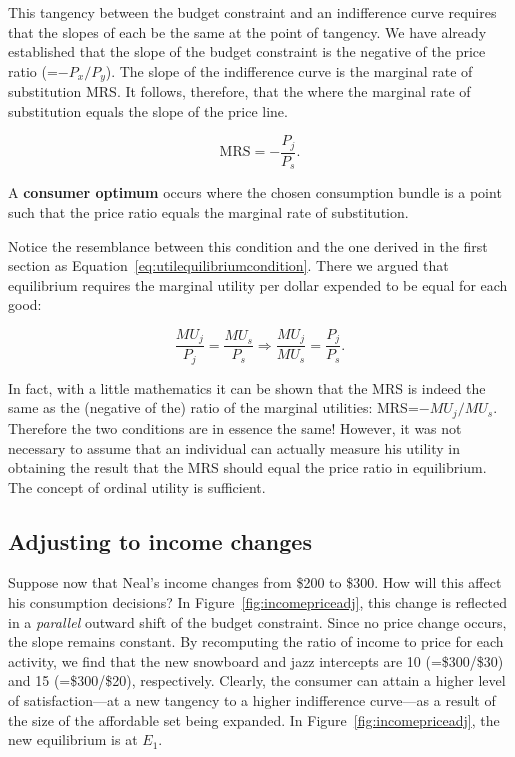This tangency between the budget constraint and an indifference curve requires that the slopes of each be the same at the point of tangency. We have already established that the slope of the budget constraint is the negative of the price ratio (=$-P_x/P_y$). The slope of the indifference curve is the marginal rate of substitution MRS. It follows, therefore, that the  where the marginal rate of substitution equals the slope of the price line.

\begin{equation} \label{eq:MRS}
\text{MRS}=-\frac{P_j}{P_s}.
\end{equation}

\begin{DefBox}
A \textbf{consumer optimum} occurs where the chosen consumption bundle is a point such that the price ratio equals the marginal rate of substitution.
\end{DefBox}

Notice the resemblance between this condition and the one derived in the first section as Equation~\ref{eq:utilequilibriumcondition}. There we argued that equilibrium requires the marginal utility per dollar expended to be equal for each good:

\begin{equation} \label{eq:marginalutilityprice}
\frac{MU_j}{P_j}=\frac{MU_s}{P_s}\Rightarrow\frac{MU_j}{MU_s}=\frac{P_j}{P_s}.
\end{equation}

In fact, with a little mathematics it can be shown that the MRS is indeed the same as the (negative of the) ratio of the marginal utilities: MRS=$-MU_j/MU_s$. Therefore the two conditions are in essence the same! However, it was not necessary to assume that an individual can actually measure his utility in obtaining the result that the MRS should equal the price ratio in equilibrium. The concept of ordinal utility is sufficient.

\subsection*{Adjusting to income changes}

Suppose now that Neal's income changes from \$200 to \$300. How will this affect his consumption decisions? In Figure~\ref{fig:incomepriceadj}, this change is reflected in a \textit{parallel} outward shift of the budget constraint. Since no price change occurs, the slope remains constant. By recomputing the ratio of income to price for each activity, we find that the new snowboard and jazz intercepts are 10 (=\$300/\$30) and 15 (=\$300/\$20), respectively. Clearly, the consumer can attain a higher level of satisfaction---at a new tangency to a higher indifference curve---as a result of the size of the affordable set being expanded. In Figure~\ref{fig:incomepriceadj}, the new equilibrium is at $E_1$.

